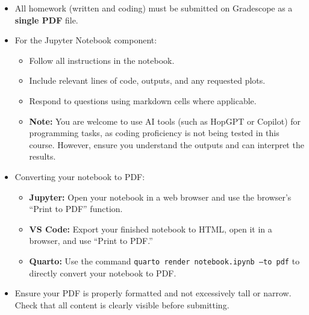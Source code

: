 \documentclass[reqno]{exam}
\begin{document}
\begin{itemize}
  \item All homework (written and coding) must be submitted on Gradescope as a \textbf{single PDF} file.

  \item For the Jupyter Notebook component:
        \begin{itemize}
          \item Follow all instructions in the notebook.
          \item Include relevant lines of code, outputs, and any requested plots.
          \item Respond to questions using markdown cells where applicable.
          \item \textbf{Note:} You are welcome to use AI tools (such as HopGPT or Copilot) for programming tasks, as coding proficiency is not being tested in this course. However, ensure you understand the outputs and can interpret the results.
        \end{itemize}

  \item Converting your notebook to PDF:
        \begin{itemize}
          \item \textbf{Jupyter:} Open your notebook in a web browser and use the browser's ``Print to PDF'' function.

          \item \textbf{VS Code:} Export your finished notebook to HTML, open it in a browser, and use ``Print to PDF.''

          \item \textbf{Quarto:} Use the command \texttt{quarto render notebook.ipynb --to pdf} to directly convert your notebook to PDF.
        \end{itemize}

  \item Ensure your PDF is properly formatted and not excessively tall or narrow. Check that all content is clearly visible before submitting.
\end{itemize}
\end{document}
